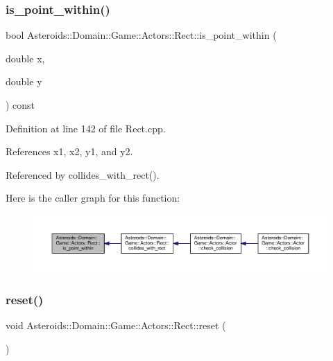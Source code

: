 \subsubsection{\texorpdfstring{is\+\_\+point\+\_\+within()}{is\_point\_within()}}
{\footnotesize\ttfamily bool Asteroids\+::\+Domain\+::\+Game\+::\+Actors\+::\+Rect\+::is\+\_\+point\+\_\+within (\begin{DoxyParamCaption}\item[{double}]{x,  }\item[{double}]{y }\end{DoxyParamCaption}) const}



Definition at line 142 of file Rect.\+cpp.



References x1, x2, y1, and y2.



Referenced by collides\+\_\+with\+\_\+rect().

Here is the caller graph for this function\+:\nopagebreak
\begin{figure}[H]
\begin{center}
\leavevmode
\includegraphics[width=350pt]{classAsteroids_1_1Domain_1_1Game_1_1Actors_1_1Rect_a9e3bfefa639425d77c9f417061b4867e_icgraph}
\end{center}
\end{figure}
\mbox{\label{classAsteroids_1_1Domain_1_1Game_1_1Actors_1_1Rect_a065181734dd1fd44e698ef52a6a265b1}} 
\subsubsection{\texorpdfstring{reset()}{reset()}}
{\footnotesize\ttfamily void Asteroids\+::\+Domain\+::\+Game\+::\+Actors\+::\+Rect\+::reset (\begin{DoxyParamCaption}{ }\end{DoxyParamCaption})}



